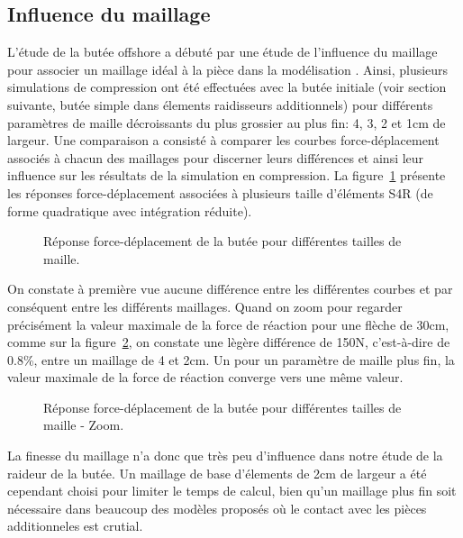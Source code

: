 ﻿\documentclass{article}
\newcommand{\abaqus}{\bsc{Abaqus}\xspace}
\begin{document}
\subsection{Influence du maillage}

L'étude de la butée offshore a débuté par une étude de l'influence du maillage pour associer un maillage idéal à la pièce dans la modélisation \abaqus. Ainsi, plusieurs simulations de compression ont été effectuées avec la butée initiale (voir section suivante, butée simple dans élements raidisseurs additionnels) pour différents paramètres de maille décroissants du plus grossier au plus fin: 4, 3, 2 et 1cm de largeur.
Une comparaison a consisté à comparer les courbes force-déplacement associés à chacun des maillages pour discerner leurs différences et ainsi leur influence sur les résultats de la simulation en compression. La figure~\ref{fig1} présente les réponses force-déplacement associées à plusieurs taille d'éléments S4R (de forme quadratique avec intégration réduite).

\begin{figure}[!h]
	\centering
	\caption{Réponse force-déplacement de la butée pour différentes tailles de maille.}
	\label{fig1}
\end{figure}


On constate à première vue aucune différence entre les différentes courbes et par conséquent entre les différents maillages. Quand on zoom pour regarder précisément la valeur maximale de la force de réaction pour une flèche de 30cm, comme sur la figure~\ref{fig2}, on constate une lègère différence de 150N, c'est-à-dire de 0.8\%, entre un maillage de 4 et 2cm. Un pour un paramètre de maille plus fin, la valeur maximale de la force de réaction converge vers une même valeur.

\begin{figure}[!h]
	\centering
	\caption{Réponse force-déplacement de la butée pour différentes tailles de maille - Zoom.}
	\label{fig2}
\end{figure}

La finesse du maillage n'a donc que très peu d'influence dans notre étude de la raideur de la butée. Un maillage de base d'élements de 2cm de largeur a été cependant choisi pour limiter le temps de calcul, bien qu'un maillage plus fin soit nécessaire dans beaucoup des modèles proposés où le contact avec les pièces additionneles est crutial.
\end{document}
